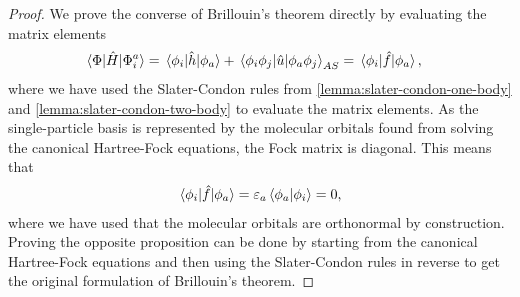             \begin{proof}
                We prove the converse of Brillouin's theorem directly by
                evaluating the matrix elements
                \begin{align}
                    \mel*{\Phi}{\hat{H}}{\Phi^{a}_{i}}
                    &= \mel*{\phi_i}{\hat{h}}{\phi_a}
                    + \mel*{\phi_i\phi_j}{\hat{u}}{\phi_a\phi_j}_{AS}
                    = \mel*{\phi_i}{\hat{f}}{\phi_a},
                \end{align}
                where we have used the Slater-Condon rules from
                \autoref{lemma:slater-condon-one-body} and
                \autoref{lemma:slater-condon-two-body} to evaluate the matrix
                elements.
                As the single-particle basis is represented by the molecular
                orbitals found from solving the canonical Hartree-Fock
                equations, the Fock matrix is diagonal.
                This means that
                \begin{align}
                    \mel*{\phi_i}{\hat{f}}{\phi_a}
                    = \varepsilon_a\braket*{\phi_a}{\phi_i}
                    = 0,
                \end{align}
                where we have used that the molecular orbitals are orthonormal by
                construction.
                Proving the opposite proposition can be done by starting from
                the canonical Hartree-Fock equations and then using the
                Slater-Condon rules in reverse to get the original formulation
                of Brillouin's theorem.
            \end{proof}



